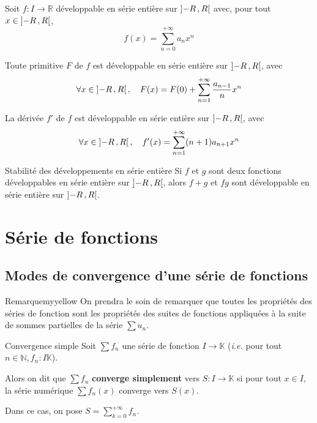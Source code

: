     \begin{prop}{}{}
        Soit $f : I \to \mathbb{R}$ développable en série entière sur $\left] -R \, , R \right[$ avec, pour tout $x \in \left] -R \, , R \right[$, 
        \[ f(x) = \sum_{n=0}^{+\infty} a_n x^n \]
        \begin{alors}
            \item Toute primitive $F$ de $f$ est développable en série entière sur $\left] -R \, , R \right[$, avec 
            \[ \forall x \in \left] -R \, , R \right[, \quad F(x) = F(0) + \sum_{n=1}^{+\infty} \frac{a_{n-1}}{n} x^n \]
            \item La dérivée $f'$ de $f$ est développable en série entière sur $\left] -R \, , R \right[$, avec 
            \[ \forall x \in \left] -R \, , R \right[, \quad f'(x) = \sum_{n=1}^{+\infty} (n+1) a_{n+1} x^n \]
        \end{alors}
    \end{prop}

    \begin{prop}{Stabilité des développements en série entière}{}
        Si $f$ et $g$ sont deux fonctions développables en série entière sur $\left] -R \, , R \right[$, alors $f+g$ et $fg$ sont développable en série entière sur $\left] -R \, , R \right[$.
    \end{prop}

\section{Série de fonctions}

\subsection{Modes de convergence d’une série de fonctions}

    \begin{omed}{Remarque}{myyellow}
        On prendra le soin de remarquer que toutes les propriétés des séries de fonction sont les propriétés des suites de fonctions appliquées à la suite de sommes partielles de la série $\sum u_n$.
    \end{omed}

    \begin{defi}{Convergence simple}{}
        Soit $\sum f_n$ une série de fonction $I \rightarrow \mathbb{K}$ (\textit{i.e.} pour tout $n \in \mathbb{N}, f_n : I \mathbb{K}$).

        Alors on dit que $\sum f_n$ \textbf{converge simplement} vers $S : I \rightarrow \mathbb{K}$ si pour tout $x \in I$, la série numérique $\sum f_n(x)$ converge vers $S(x)$.

        Dans ce cas, on pose $S = \sum_{k=0}^{+\infty} f_n$.
    \end{defi}

